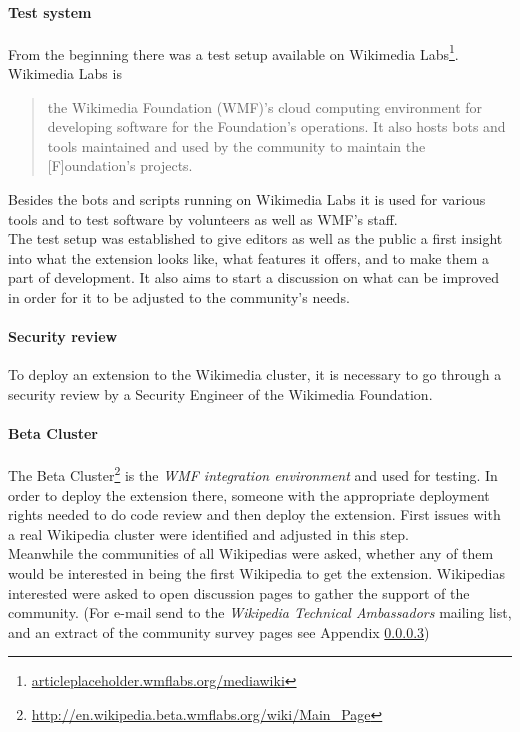 \paragraph{Test system}
From the beginning there was a test setup available on Wikimedia Labs\footnote{\url{articleplaceholder.wmflabs.org/mediawiki}}. Wikimedia Labs is 
\begin{quotation}
	the Wikimedia Foundation (WMF)'s cloud computing environment for developing software for the Foundation's operations. It also hosts bots and tools maintained and used by the community to maintain the [F]oundation's projects. 
\end{quotation} \citep{wiki:03}
Besides the bots and scripts running on Wikimedia Labs it is used for various tools and to test software by volunteers as well as WMF's staff. \\
The test setup was established to give editors as well as the public a first insight into what the extension looks like, what features it offers, and to make them a part of development. It also aims to start a discussion on what can be improved in order for it to be adjusted to the community's needs.

\paragraph{Security review}
To deploy an extension to the Wikimedia cluster, it is necessary to go through a security review by a Security Engineer of the Wikimedia Foundation. 
  
\paragraph{Beta Cluster}
The Beta Cluster\footnote{\url{http://en.wikipedia.beta.wmflabs.org/wiki/Main_Page}} is the \textit{WMF integration environment} and used for testing. In order to deploy the extension there, someone with the appropriate deployment rights needed to do code review and then deploy the extension. First issues with a real Wikipedia cluster were identified and adjusted in this step. \\
Meanwhile the communities of all Wikipedias were asked, whether any of them would be interested in being the first Wikipedia to get the extension. Wikipedias interested were asked to open discussion pages to gather the support of the community. (For e-mail send to the \textit{Wikipedia Technical Ambassadors} mailing list, and an extract of the community survey pages see Appendix \ref{})

